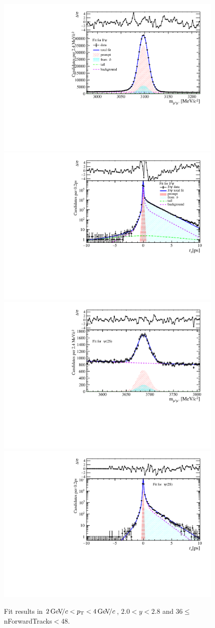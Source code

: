 \begin{figure}[H]
\begin{center}
\includegraphics[width=0.47\linewidth]{pdf/Jpsi/drawmassF/n4y1pt2.pdf}
\includegraphics[width=0.47\linewidth]{pdf/Jpsi/2DFitF/n4y1pt2.pdf}
\vspace*{-0.5cm}
\includegraphics[width=0.47\linewidth]{pdf/Psi2S/drawmassF/n4y1pt2.pdf}
\includegraphics[width=0.47\linewidth]{pdf/Psi2S/2DFitF/n4y1pt2.pdf}
\vspace*{-0.5cm}
\end{center}
\caption{Fit results in $2\text{\,Ge\kern -0.1em V\!/}c<p_{\mathrm{T}}<4\text{\,Ge\kern -0.1em V\!/}c$, $2.0<y<2.8$ and 36$\leq$nForwardTracks$<$48.}
\label{Fitn4y1pt2}
\end{figure}
